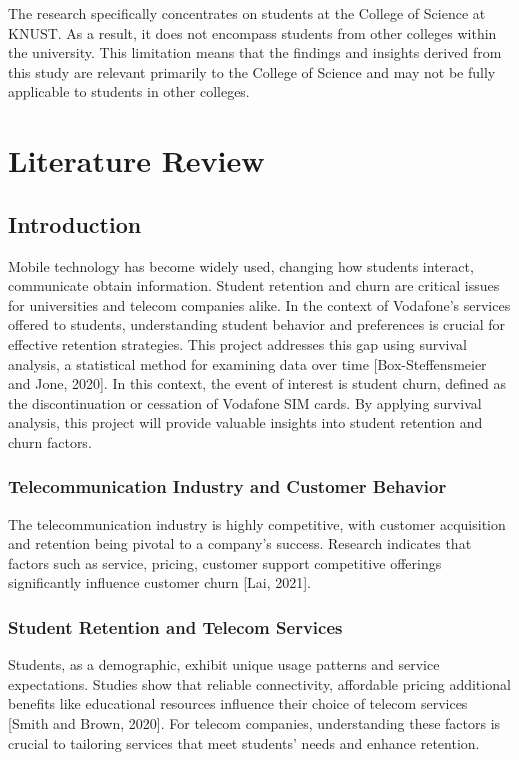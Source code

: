 \documentclass[doublespacing,12pt]{report}
\begin{document}
The research specifically concentrates on students at the College of Science at KNUST. As a result, it does not encompass students from other colleges within the university. This limitation means that the findings and insights derived from this study are relevant primarily to the College of Science and may not be fully applicable to students in other colleges.

\newpage
\chapter{Literature Review}


\section{Introduction}
Mobile technology has become widely used, changing how students interact, communicate obtain information. Student retention and churn are critical issues for universities and telecom companies alike. In the context of Vodafone's services offered to students, understanding student behavior and preferences is crucial for effective retention strategies. This project addresses this gap using survival analysis, a statistical method for examining data over time [Box-Steffensmeier and Jone, 2020]. In this context, the event of interest is student churn, defined as the discontinuation or cessation of Vodafone SIM cards. By applying survival analysis, this project will provide valuable insights into student retention and churn factors.

\subsection{Telecommunication Industry and Customer Behavior}
The telecommunication industry is highly competitive, with customer acquisition and retention being pivotal to a company's success. Research indicates that factors such as service, pricing, customer support competitive offerings significantly influence customer churn [Lai, 2021].

\subsection{Student Retention and Telecom Services}
Students, as a demographic, exhibit unique usage patterns and service expectations. Studies show that reliable connectivity, affordable pricing additional benefits like educational resources influence their choice of telecom services [Smith and Brown, 2020]. For telecom companies, understanding these factors is crucial to tailoring services that meet students’ needs and enhance retention.
\end{document}
